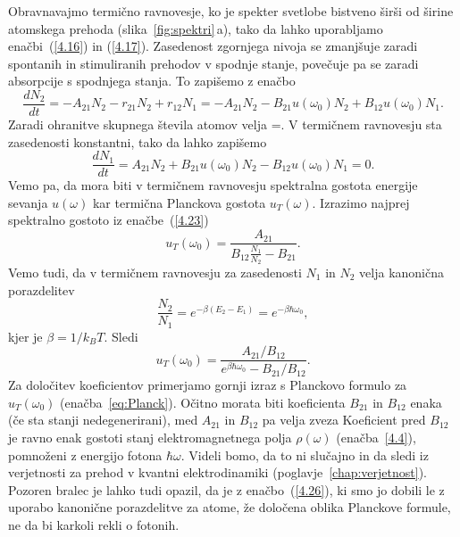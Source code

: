 Obravnavajmo termično ravnovesje, ko je spekter svetlobe bistveno širši
od širine atomskega prehoda (slika~\ref{fig:spektri}\,a), tako da lahko
uporabljamo enačbi~(\ref{4.16}) in (\ref{4.17}). Zasedenost zgornjega nivoja
se zmanjšuje zaradi spontanih in stimuliranih prehodov v spodnje
stanje, povečuje pa se zaradi absorpcije s spodnjega stanja. To zapišemo z enačbo
\begin{equation}
\frac{dN_{2}}{dt}=-A_{21}N_2 - r_{21}N_2 + r_{12}N_1 = 
-A_{21}N_{2}-B_{21}u(\omega_{0})N_{2}+B_{12}u(\omega_{0})N_{1}.
\label{4.22}
\end{equation}
Zaradi ohranitve skupnega števila atomov velja 
\beq
{}=.
\eeq
V termičnem ravnovesju sta zasedenosti konstantni, tako da lahko zapišemo 
\begin{equation}
\frac{dN_{1}}{dt}=A_{21}N_{2}+B_{21}u(\omega_{0})N_{2}-B_{12}u(\omega_{0})N_{1}=0.
\label{4.23}
\end{equation}
Vemo pa, da mora biti v termičnem ravnovesju spektralna gostota energije sevanja
$u(\omega)$ kar termična Planckova gostota $u_{T}(\omega)$.
Izrazimo najprej spektralno gostoto iz enačbe~(\ref{4.23})
\begin{equation}
u_{T}(\omega_{0})=\frac{A_{21}}{B_{12}\frac{N_{1}}{N_{2}}-B_{21}}.
\label{4.24}
\end{equation}
Vemo tudi, da v termičnem ravnovesju za zasedenosti $N_{1}$ in $N_{2}$ velja
kanonična porazdelitev
\begin{equation}
\frac{N_{2}}{N_{1}}=e^{-\beta(E_{2}-E_{1})} = e^{-\beta \hbar \omega_0},
\label{4.25}
\end{equation}
kjer je $\beta=1/k_BT$. Sledi
\begin{equation}
u_{T}(\omega_{0})=\frac{A_{21}/B_{12}}{e^{\beta\hbar\omega_{0}}-B_{21}/B_{12}}.
\label{4.26}
\end{equation}
Za določitev koeficientov primerjamo gornji izraz s Planckovo formulo za $u_{T}(\omega_{0})$
(enačba~\ref{eq:Planck}). Očitno morata biti koeficienta $B_{21}$ in $B_{12}$ enaka 
(če sta stanji nedegenerirani), med $A_{21}$ in $B_{12}$ pa velja zveza 
Koeficient pred $B_{12}$ je ravno enak gostoti stanj elektromagnetnega polja 
$\rho(\omega)$ (enačba~\ref{4.4}), pomnoženi z energijo fotona $\hbar\omega$. 
Videli bomo, da to ni slučajno in da sledi iz verjetnosti za prehod v kvantni 
elektrodinamiki (poglavje~\ref{chap:verjetnost}).
Pozoren bralec je lahko tudi opazil, da je z enačbo~(\ref{4.26}),
ki smo jo dobili le z uporabo kanonične porazdelitve za atome, že
določena oblika Planckove formule, ne da bi karkoli rekli o fotonih.

